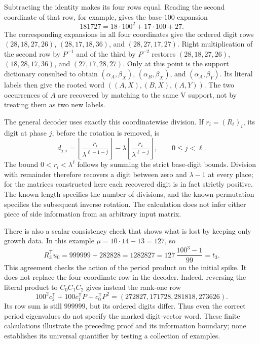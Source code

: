 \documentclass[11pt,letterpaper]{article}
\theoremstyle{definition}
\theoremstyle{remark}
\numberwithin{equation}{section}
\begin{document}
Subtracting the identity makes its four rows equal.  Reading the second
coordinate of that row, for example, gives the base-\(100\) expansion
\[
 181727=18\cdot100^2+17\cdot100+27.
\]
The corresponding expansions in all four coordinates give the ordered
digit rows \((28,18,27,26)\), \((28,17,18,36)\), and
\((28,27,17,27)\).  Right multiplication of the second row by \(P^{-1}\)
and of the third by \(P^{-2}\) restores
\((28,18,27,26)\), \((18,28,17,36)\), and \((27,17,28,27)\).
Only at this point is the support dictionary consulted to obtain
\((\alpha_A,\beta_X)\), \((\alpha_B,\beta_X)\), and
\((\alpha_A,\beta_Y)\).  Its literal labels then give the rooted word
\(((A,X),(B,X),(A,Y))\).  The two occurrences of \(A\) are recovered by
matching to the same V support, not by treating them as two new labels.

The general decoder uses exactly this coordinatewise division.  If
\(r_i=(R_\ell)_i\), its digit at phase \(j\), before the rotation is
removed, is
\begin{equation}
 d_{j,i}=
 \left\lfloor\frac{r_i}{\lambda^{\ell-1-j}}\right\rfloor
 -\lambda
  \left\lfloor\frac{r_i}{\lambda^{\ell-j}}\right\rfloor,
 \qquad 0\leq j<\ell .
 \label{eq:decoder-division}
\end{equation}
The bound \(0<r_i<\lambda^\ell\) follows by summing the strict
base-digit bounds.  Division with remainder therefore recovers a digit
between zero and \(\lambda-1\) at every place; for the matrices constructed
here each recovered digit is in fact strictly positive.  The known length
specifies the number of divisions, and the known permutation specifies the
subsequent inverse rotation.  The calculation does not infer either piece
of side information from an arbitrary input matrix.

There is also a scalar consistency check that shows what is lost by keeping
only growth data.  In this example \(\mu=10\cdot14-13=127\), so
\[
 R_3^{\mathsf T}u_0=999999+282828=1282827
       =127\,\frac{100^3-1}{99}=t_3.
\]
This agreement checks the action of the period product on the initial
spike.  It does not replace the four-coordinate row in the decoder.
Indeed, reversing the literal product to \(C_0C_1C_2\) gives instead the
rank-one row
\[
 100^2c_2^{\mathsf T}+100c_1^{\mathsf T}P+c_0^{\mathsf T}P^2
       =(272827,171728,281818,273626).
\]
Its row sum is still \(999999\), but its ordered digits differ.
Thus even the correct period eigenvalues do not specify the marked
digit-vector word.  These finite calculations illustrate the preceding
proof and its information boundary; none establishes its universal
quantifier by testing a collection of examples.
\end{document}
